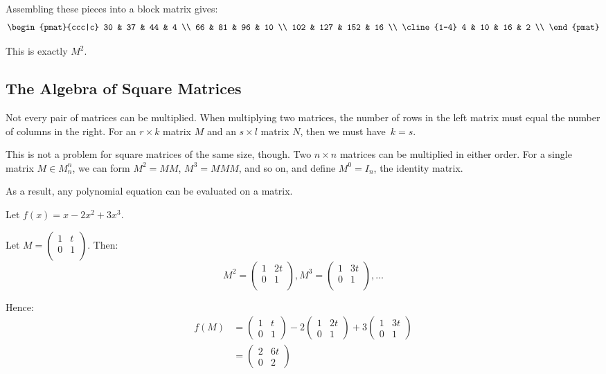 \begin{itemize}
Assembling these pieces into a block matrix gives:
\[
\begin{pmat}{ccc|c}
30 & 37 & 44 & 4 \\
66 & 81 & 96 & 10 \\
102 & 127 & 152 & 16 \\
\cline{1-4}
4 & 10 & 16 & 2 \\
\end{pmat}
\]

This is exactly $M^2$.
\end{itemize}

\subsection{The Algebra of Square Matrices }

Not every pair of matrices can be multiplied.  When multiplying two matrices, the number of rows in the left matrix must equal the number of columns in the right.  For an $r\times k$ matrix $M$ and an $s\times l$ matrix $N$, then we must have~$k=s$.

This is not a problem for square matrices of the same size, though.  Two $n\times n$ matrices can be multiplied in either order.  For a single matrix $M \in M^n_n$, we can form $M^2=MM$, $M^3=MMM$, and so on, and define $M^0=I_n$, the identity matrix.

As a result, any polynomial equation can be evaluated on a matrix.

\begin{example}
Let $f(x) = x - 2x^2 + 3x^3$.

Let $M=\begin{pmatrix}
1 & t \\
0 & 1 \\
\end{pmatrix}$.  Then:
\[
M^2 = \begin{pmatrix}
1 & 2t \\
0 & 1 \\
\end{pmatrix},
M^3 = \begin{pmatrix}
1 & 3t \\
0 & 1 \\
\end{pmatrix}, \ldots
\]

Hence:
\begin{align*}
f(M) &=\begin{pmatrix}
	1 & t \\
	0 & 1
	\end{pmatrix} 
- 2 \begin{pmatrix}
	1 & 2t \\
	0 & 1
	\end{pmatrix} 
+ 3 \begin{pmatrix}
	1 & 3t \\
	0 & 1
	\end{pmatrix} \\
&= \begin{pmatrix}
	2 & 6t \\
	0 & 2
	\end{pmatrix}
\end{align*}
\end{example}

